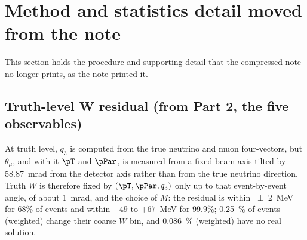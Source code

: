 \section{Method and statistics detail moved from the note}
This section holds the procedure and supporting detail that the compressed note no longer prints, as the note printed it.

\subsection{Truth-level W residual (from Part 2, the five observables)}
At truth level, $q_{3}$ is computed from the true neutrino and muon four-vectors, but $\theta_{\mu}$, and with it $\pT$ and $\pPar$, is measured from a fixed beam axis tilted by \SI{58.87}{mrad} from the detector axis rather than from the true neutrino direction.  Truth $W$ is therefore fixed by $(\pT,\pPar,q_{3})$ only up to that event-by-event angle, of about \SI{1}{mrad}, and the choice of $M$: the residual is within \SI{\pm2}{MeV} for 68\% of events and within $-49$ to $+67$~MeV for 99.9\%; \SI{0.25}{\percent} of events (weighted) change their coarse $W$ bin, and \SI{0.086}{\percent} (weighted) have no real solution. %

